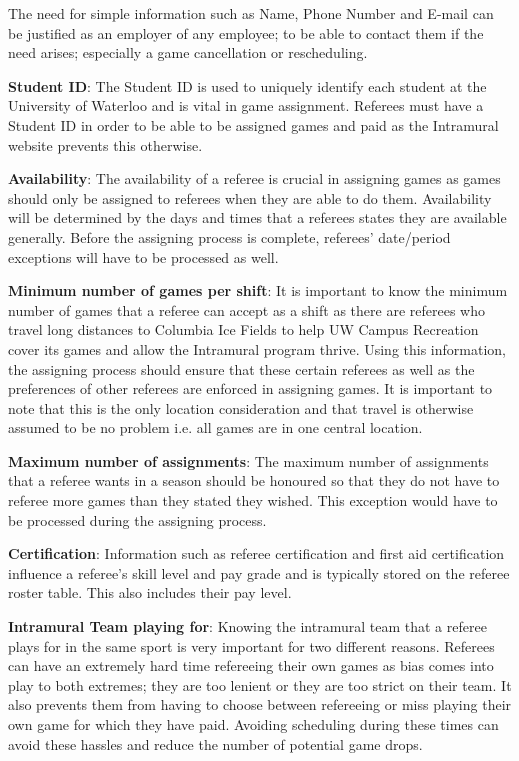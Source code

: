 \documentclass{article}
\begin{document}
The need for simple information such as Name, Phone Number and E-mail can be justified as an employer of any employee; to be able to contact them if the need arises; especially a game cancellation or rescheduling.

{\bf Student ID}: The Student ID is used to uniquely identify each student at the University of Waterloo and is vital in game assignment. Referees must have a Student ID in order to be able to be assigned games and paid as the Intramural website prevents this otherwise.

{\bf Availability}: The availability of a referee is crucial in assigning games as games should only be assigned to referees when they are able to do them. Availability will be determined by the days and times that a referees states they are available generally. Before the assigning process is complete, referees' date/period exceptions will have to be processed as well.

{\bf Minimum number of games per shift}: It is important to know the minimum number of games that a referee can accept as a shift as there are referees who travel long distances to Columbia Ice Fields to help UW Campus Recreation cover its games and allow the Intramural program thrive. Using this information, the assigning process should ensure that these certain referees as well as the preferences of other referees are enforced in assigning games. It is important to note that this is the only location consideration and that travel is otherwise assumed to be no problem i.e. all games are in one central location.

{\bf Maximum number of assignments}: The maximum number of assignments that a referee wants in a season should be honoured so that they do not have to referee more games than they stated they wished. This exception would have to be processed during the assigning process.

{\bf Certification}: Information such as referee certification and first aid certification influence a referee's skill level and pay grade and is typically stored on the referee roster table. This also includes their pay level.

{\bf Intramural Team playing for}: Knowing the intramural team that a referee plays for in the same sport is very important for two different reasons. Referees can have an extremely hard time refereeing their own games as bias comes into play to both extremes; they are too lenient or they are too strict on their team. It also prevents them from having to choose between refereeing or miss playing their own game for which they have paid. Avoiding scheduling during these times can avoid these hassles and reduce the number of potential game drops.
\end{document}
